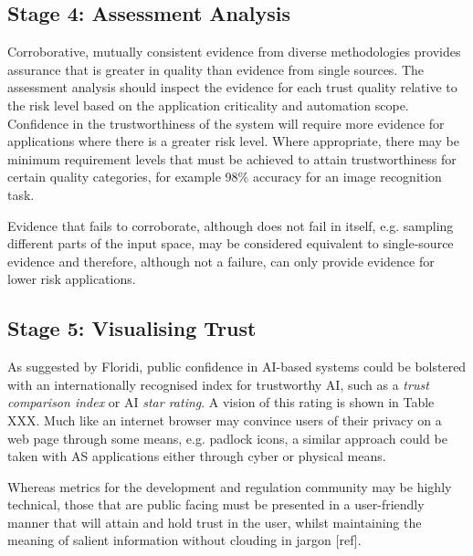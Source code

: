 \subsection{Stage 4: Assessment Analysis}


Corroborative, mutually consistent evidence from diverse methodologies provides assurance that is greater in quality than evidence from single sources. 
%
The assessment analysis should inspect the evidence for each trust quality relative to the risk level based on the application criticality and automation scope. Confidence in the trustworthiness of the system will require more evidence for applications where there is a greater risk level. 
%
Where appropriate, there may be minimum requirement levels that must be achieved to attain trustworthiness for certain quality categories, for example 98\% accuracy for an image recognition task.

Evidence that fails to corroborate, although does not fail in itself, e.g. sampling different parts of the input space, may be considered equivalent to single-source evidence and therefore, although not a failure, can only provide evidence for lower risk applications.


\subsection{Stage 5: Visualising Trust}



As suggested by Floridi, public confidence in AI-based systems could be bolstered with an internationally recognised index for trustworthy AI, such as a \emph{trust comparison index} or AI \emph{star rating}. A vision of this rating is shown in Table XXX. Much like an internet browser may convince users of their privacy on a web page through some means, e.g. padlock icons, a similar approach could be taken with AS applications either through cyber or physical means.

Whereas metrics for the development and regulation community may be highly technical, those that are public facing must be presented in a user-friendly manner that will attain and hold trust in the user, whilst maintaining the meaning of salient information without clouding in jargon [ref]. 

